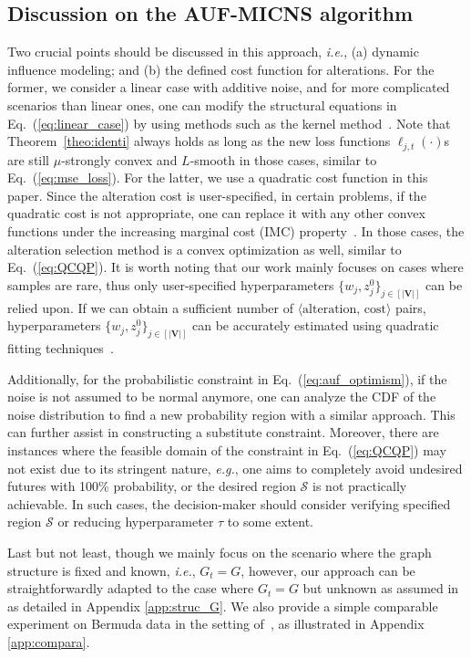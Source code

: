 \documentclass{article}
\theoremstyle{plain}
\theoremstyle{definition}
\theoremstyle{remark}
\def \eg {\textit{e.g.}}
\def \ie {\textit{i.e.}}
\def \Eq {Eq.}
\def \V {\mathbf{V}}
\def \sS {\mathcal{S}}
\def \V {\mathbf{V}}
\begin{document}
\subsection{Discussion on the AUF-MICNS algorithm}
Two crucial points should be discussed in this approach, 
\ie, (a) dynamic influence modeling; and (b) the defined cost function for alterations. 
For the former, we consider a linear case with additive noise, and for more complicated scenarios than linear ones, 
one can modify the structural equations in \Eq~(\ref{eq:linear_case}) by using methods such as the kernel method~\citep{hofmann2008kernel}.
Note that Theorem~\ref{theo:identi} always holds as long as the new loss functions $\ell_{j, t}(\cdot)$s are still $\mu$-strongly convex and $L$-smooth in those cases, similar to \Eq~(\ref{eq:mse_loss}).
For the latter, we use a quadratic cost function in this paper.
Since the alteration cost is user-specified, in certain problems, if the quadratic cost is not appropriate, one can replace it with any other convex functions under the increasing marginal cost (IMC) property~\citep{mankiw2020economics}.  
In those cases, the alteration selection method is a convex optimization as well, similar to \Eq~(\ref{eq:QCQP}). 
It is worth noting that our work mainly focuses on cases where samples are rare, thus only user-specified hyperparameters  $\{w_j, z^0_j\}_{j\in[|\V|]}$ can be relied upon. If we can obtain a sufficient number of $\langle\text{alteration, cost}\rangle$ pairs, hyperparameters $\{w_j, z^0_j\}_{j\in[|\V|]}$ can be accurately estimated using quadratic fitting techniques~\citep{hastie2009esl}. 

Additionally, for the probabilistic constraint in \Eq~(\ref{eq:auf_optimism}), if the noise is not assumed to be normal anymore, 
one can analyze the CDF of the noise distribution to find a new probability region with a similar approach. 
This can further assist in constructing a substitute constraint. 
Moreover, there are instances where the feasible domain of the constraint in \Eq~(\ref{eq:QCQP}) may not exist due to its stringent nature, 
\eg, one aims to completely avoid undesired futures with 100\% probability, or the desired region $\sS$ is not practically achievable.
In such cases, the decision-maker should consider verifying specified region $\sS$ or reducing hyperparameter $\tau$ to some extent. 

Last but not least, though we mainly focus on the scenario where the graph structure is fixed and known, \ie, $G_t=G$, however, our approach can be straightforwardly adapted to the case where $G_t=G$ but unknown as assumed in \citet{qint2023srm} as detailed in Appendix \ref{app:struc_G}. We also provide a simple comparable experiment on Bermuda data in the setting of~\citet{qint2023srm}, as illustrated in Appendix \ref{app:compara}.
\end{document}
